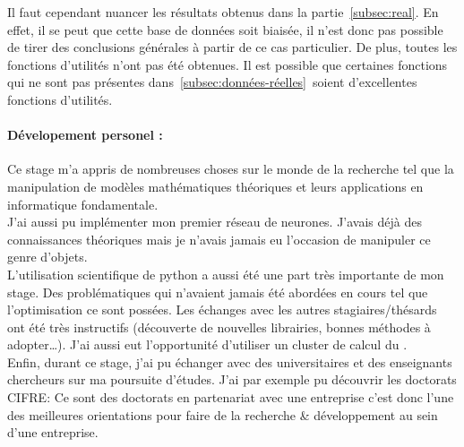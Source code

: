 
Il faut cependant nuancer les résultats obtenus dans la partie\ \ref{subsec:real}.
En effet, il se peut que cette base de données soit biaisée,
il n'est donc pas possible de tirer des conclusions générales à partir de ce cas particulier.
De plus, toutes les fonctions d'utilités n'ont pas été obtenues.
Il est possible que certaines fonctions qui ne sont pas présentes dans\ \ref{subsec:données-réelles}\
soient d'excellentes fonctions d'utilités.


\paragraph{Dévelopement personel :\\}
Ce stage m'a appris de nombreuses choses sur le monde de la recherche tel
que la manipulation de modèles mathématiques théoriques et leurs applications
en informatique fondamentale.\\


J'ai aussi pu implémenter mon premier réseau de neurones.
J'avais déjà des connaissances théoriques mais je
n'avais jamais eu l'occasion de manipuler ce genre d'objets.\\


L'utilisation scientifique de python a aussi été une part très importante de mon stage.
Des problématiques qui n'avaient jamais été abordées en cours tel que l'optimisation ce sont possées.
Les échanges avec les autres stagiaires/thésards ont été très instructifs
(découverte de nouvelles librairies, bonnes méthodes à adopter\ldots).
J'ai aussi eut l'opportunité d'utiliser un cluster de calcul du \lri.\\


Enfin, durant ce stage, j'ai pu échanger avec des universitaires et des enseignants chercheurs
sur ma poursuite d'études.
J'ai par exemple pu découvrir les doctorats \textsc{CIFRE}\cite{cifre}:
Ce sont des doctorats en partenariat avec une entreprise c'est donc l'une des meilleures
orientations pour faire de la recherche & développement au sein d'une entreprise.
